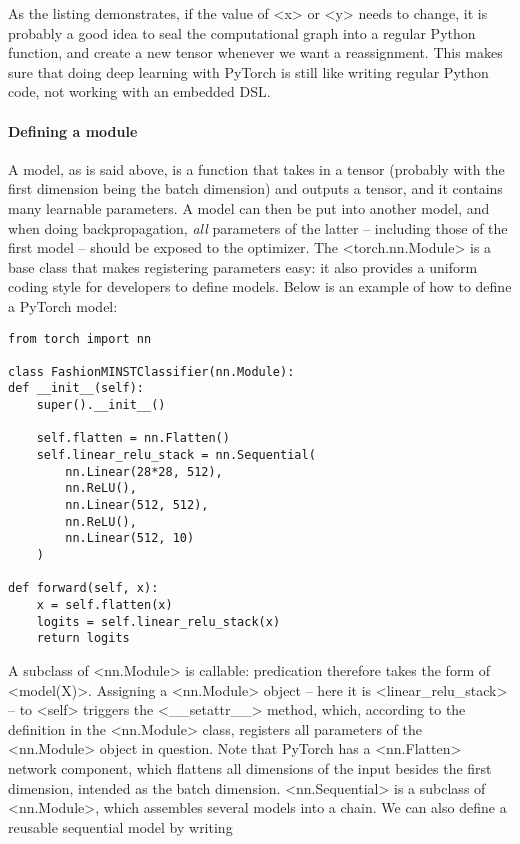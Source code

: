 \documentclass[hyperref, a4paper, 12pt]{report}
\def\texttt#1{<#1>}%
\newcommand{\shortcode}[1]{\texttt{#1}}
\begin{document}
As the listing demonstrates, if the value of \shortcode{x} or \shortcode{y} needs to change,
it is probably a good idea to seal the computational graph into a regular Python function,
and create a new tensor whenever we want a reassignment.
This makes sure that doing deep learning with PyTorch is still like writing regular Python code,
not working with an embedded DSL.

\paragraph*{Defining a module}
A model, as is said above, is a function that takes in a tensor (probably with the first dimension being the batch dimension) and outputs a tensor,
and it contains many learnable parameters.
A model can then be put into another model,
and when doing backpropagation,
\emph{all} parameters of the latter -- including those of the first model -- 
should be exposed to the optimizer.
The \shortcode{torch.nn.Module} is a base class that makes registering parameters easy:
it also provides a uniform coding style for developers to define models.
Below is an example of how to define a PyTorch model:

\begin{lstlisting}
from torch import nn 

class FashionMINSTClassifier(nn.Module):
def __init__(self):
    super().__init__()
    
    self.flatten = nn.Flatten()
    self.linear_relu_stack = nn.Sequential(
        nn.Linear(28*28, 512),
        nn.ReLU(),
        nn.Linear(512, 512),
        nn.ReLU(),
        nn.Linear(512, 10)
    )
    
def forward(self, x):
    x = self.flatten(x)
    logits = self.linear_relu_stack(x)
    return logits
\end{lstlisting}

A subclass of \shortcode{nn.Module} is callable:
predication therefore takes the form of \shortcode{model(X)}.
Assigning a \shortcode{nn.Module} object -- here it is \shortcode{linear_relu_stack} -- to \shortcode{self} triggers the \shortcode{__setattr__} method,
which, according to the definition in the \shortcode{nn.Module} class,
registers all parameters of the \shortcode{nn.Module} object in question.
Note that PyTorch has a \shortcode{nn.Flatten} network component,
which flattens all dimensions of the input besides the first dimension,
intended as the batch dimension.
\shortcode{nn.Sequential} is a subclass of \shortcode{nn.Module},
which assembles several models into a chain.
We can also define a reusable sequential model by writing
\end{document}
